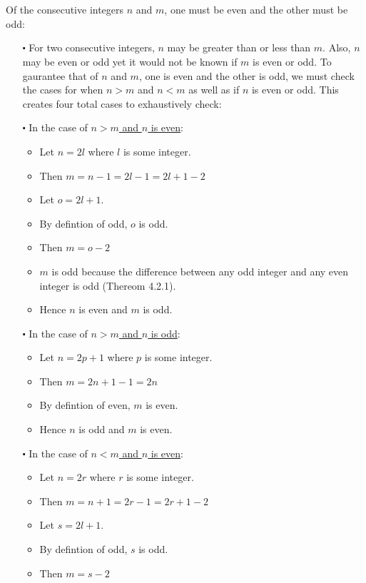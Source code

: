 \documentclass[12pt]{article}
\begin{document}
\newblock
\\ \\
Of the consecutive integers $n$ and $m$, one must be even and the other must be odd:
\begin{itemize}
  \item [$\centerdot$] For two consecutive integers, $n$ may be greater than or less than $m$. 
  Also, $n$ may be even or odd yet it would not be known if $m$ is even or odd.
  To gaurantee that of $n$ and $m$, one is even and the other is odd, we must check the cases for when $n>m$ and $n<m$ as well as if $n$ is even or odd.
  This creates four total cases to exhaustively check:
  \item [$\centerdot$] In the case of \underline{$n>m$ and $n$ is even}:
  \begin{itemize}
    \item Let $n = 2l$ where $l$ is some integer.
    \item Then $m = n-1 = 2l-1 = 2l+1-2$
    \item Let $o=2l+1$.
    \item By defintion of odd, $o$ is odd.
    \item Then $m = o - 2$
    \item $m$ is odd because the difference between any odd integer and any even integer is odd (Thereom 4.2.1).
    \item Hence $n$ is even and $m$ is odd.
  \end{itemize}
  \item [$\centerdot$] In the case of \underline{$n>m$ and $n$ is odd}:
  \begin{itemize}
    \item Let $n = 2p+1$ where $p$ is some integer.
    \item Then $m = 2n + 1 -1 = 2n$
    \item By defintion of even, $m$ is even.
    \item Hence $n$ is odd and $m$ is even.
  \end{itemize}
  \item [$\centerdot$] In the case of \underline{$n<m$ and $n$ is even}:
  \begin{itemize}
    \item Let $n = 2r$ where $r$ is some integer.
    \item Then $m = n+1 = 2r-1 = 2r+1-2$
    \item Let $s=2l+1$.
    \item By defintion of odd, $s$ is odd.
    \item Then $m =s-2$

\end{itemize}
\end{itemize}
\end{document}
